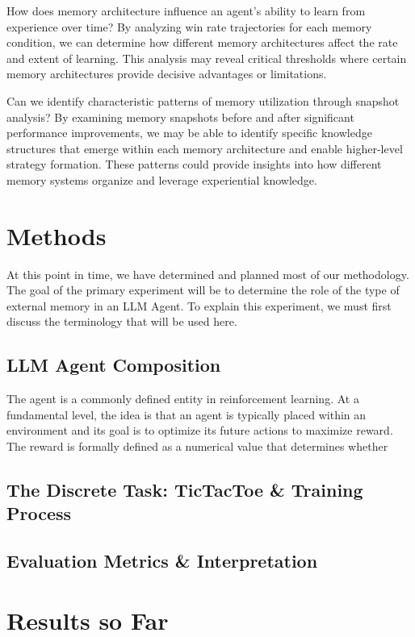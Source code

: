 \documentclass{article}
\begin{document}
How does memory architecture influence an agent's ability to learn from experience over time? By analyzing win rate trajectories for each memory condition, we can determine how different memory architectures affect the rate and extent of learning. This analysis may reveal critical thresholds where certain memory architectures provide decisive advantages or limitations.

Can we identify characteristic patterns of memory utilization through snapshot analysis? By examining memory snapshots before and after significant performance improvements, we may be able to identify specific knowledge structures that emerge within each memory architecture and enable higher-level strategy formation. These patterns could provide insights into how different memory systems organize and leverage experiential knowledge.

\section{Methods}
At this point in time, we have determined and planned most of our methodology. The goal of the primary experiment will be to determine the role of the type of external memory in an LLM Agent. To explain this experiment, we must first discuss the terminology that will be used here.

\subsection{LLM Agent Composition}
The agent is a commonly defined entity in reinforcement learning. At a fundamental level, the idea is that an agent is typically placed within an environment and its goal is to optimize its future actions to maximize reward. The reward is formally defined as a numerical value that determines whether 

\subsection{The Discrete Task: TicTacToe \& Training Process}

\subsection{Evaluation Metrics \& Interpretation}

\section{Results so Far}
\end{document}
